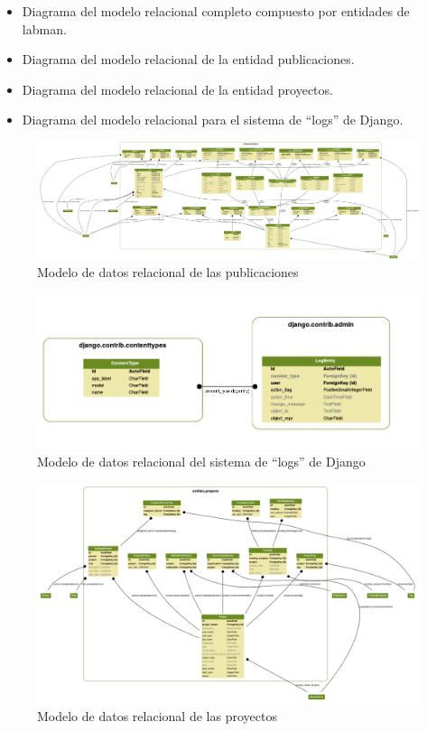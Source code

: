 \begin{itemize}
	\item Diagrama del modelo relacional completo compuesto por entidades de \acrshort{labman}.
	\item Diagrama del modelo relacional de la entidad publicaciones.
	\item Diagrama del modelo relacional de la entidad proyectos.
	\item Diagrama del modelo relacional para el sistema de ``logs'' de Django.
\end{itemize}

\begin{figure}[!htbp]
	\centering
	\includegraphics[angle=-90, scale=0.17]{fig/dbmodel/publications}
	\caption{Modelo de datos relacional de las publicaciones}
	\label{fig:publicationsmodel}
\end{figure}

\begin{figure}[!htbp]
	\centering
	\includegraphics[scale=0.5]{fig/dbmodel/django_log}
	\caption{Modelo de datos relacional del sistema de ``logs'' de Django}
	\label{fig:logsmodel}
\end{figure}

\begin{figure}[!htbp]
	\centering
	\includegraphics[angle=-90, scale=0.35]{fig/dbmodel/projects}
	\caption{Modelo de datos relacional de las proyectos}
	\label{fig:projectsmodel}
\end{figure}